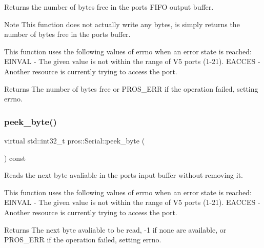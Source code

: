 Returns the number of bytes free in the port\textquotesingle{}s F\+I\+FO output buffer.

\begin{DoxyNote}{Note}
This function does not actually write any bytes, is simply returns the number of bytes free in the port\textquotesingle{}s buffer.
\end{DoxyNote}
This function uses the following values of errno when an error state is reached\+: E\+I\+N\+V\+AL -\/ The given value is not within the range of V5 ports (1-\/21). E\+A\+C\+C\+ES -\/ Another resource is currently trying to access the port.

\begin{DoxyReturn}{Returns}
The number of bytes free or P\+R\+O\+S\+\_\+\+E\+RR if the operation failed, setting errno. 
\end{DoxyReturn}
\mbox{\label{classpros_1_1Serial_a5ec51db5a7726f2220723971c1999881}} 
\subsubsection{\texorpdfstring{peek\+\_\+byte()}{peek\_byte()}}
{\footnotesize\ttfamily virtual std\+::int32\+\_\+t pros\+::\+Serial\+::peek\+\_\+byte (\begin{DoxyParamCaption}{ }\end{DoxyParamCaption}) const\hspace{0.3cm}{\ttfamily [virtual]}}

Reads the next byte avaliable in the port\textquotesingle{}s input buffer without removing it.

This function uses the following values of errno when an error state is reached\+: E\+I\+N\+V\+AL -\/ The given value is not within the range of V5 ports (1-\/21). E\+A\+C\+C\+ES -\/ Another resource is currently trying to access the port.

\begin{DoxyReturn}{Returns}
The next byte avaliable to be read, -\/1 if none are available, or P\+R\+O\+S\+\_\+\+E\+RR if the operation failed, setting errno. 
\end{DoxyReturn}
\mbox{\label{classpros_1_1Serial_a0d42f31fa7a5bd936010a346167c1946}} 
